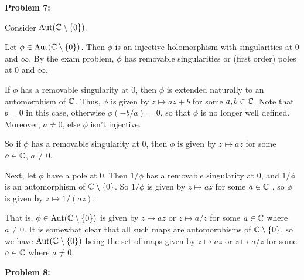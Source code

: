 \documentclass[a4paper,12pt]{article}
\begin{document}
\shunt

{\bf Problem 7:}

Consider $\text{Aut}(\mathbb{C} \setminus \{0\})$.

Let $\phi \in \text{Aut}(\mathbb{C} \setminus \{0\})$. Then $\phi$ is an injective holomorphism with singularities at $0$ and $\infty$. By the exam problem, $\phi$ has removable singularities or (first order) poles at $0$ and $\infty$.

If $\phi$ has a removable singularity at $0$, then $\phi$ is extended naturally to an automorphism of $\mathbb{C}$. Thus, $\phi$ is given by $z \mapsto az+b$ for some $a,b \in \mathbb{C}$. Note that $b=0$ in this case, otherwise $\phi(-b/a) = 0$, so that $\phi$ is no longer well defined. Moreover, $a \neq 0$, else $\phi$ isn't injective.

So if $\phi$ has a removable singularity at $0$, then $\phi$ is given by $z \mapsto az$ for some $a \in \mathbb{C}$, $a \neq 0$.

Next, let $\phi$ have a pole at $0$. Then $1/\phi$ has a removable singularity at $0$, and $1/\phi$ is an automorphism of $\mathbb{C} \setminus \{0\}$. So $1/\phi$ is given by $z \mapsto az$ for some $a \in \mathbb{C}$ , so $\phi$ is given by $z \mapsto 1/(az)$.

That is, $\phi \in \text{Aut}(\mathbb{C} \setminus \{0\})$ is given by $z \mapsto az$ or $z \mapsto a/z$ for some $a \in \mathbb{C}$ where $a \neq 0$. It is somewhat clear that all such maps are automorphisms of $\mathbb{C} \setminus \{0\}$, so we have $\text{Aut}(\mathbb{C} \setminus \{0\})$ being the set of maps given by $z \mapsto az$ or $z \mapsto a/z$ for some $a \in \mathbb{C}$ where $a \neq 0$. %

\shunt

{\bf Problem 8:}

\shunt
\end{document}
